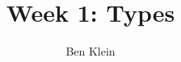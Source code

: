 \documentclass[]{article}
\title{Week 1: Types}
\author{Ben Klein}
\begin{document}
\maketitle

\textbf{}\\


\begin{flushleft}
\begin{enumerate}

\end{enumerate}
\end{flushleft}
\end{document}
